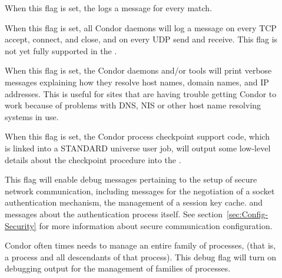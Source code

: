 \begin{description}
\begin{description}
  \item[] \label{dflag:match}
    When this flag is
    set, the  logs a message for every match.

  \item[] \label{dflag:network}
    When this flag is set,
    all Condor daemons will log a message on every TCP accept, connect,
    and close, and on every UDP send and receive.  This flag is not
    yet fully supported in the .

  \item[] \label{dflag:hostname}
    When this flag is set, the Condor daemons and/or tools will print
    verbose messages explaining how they resolve host names, domain
    names, and IP addresses.
    This is useful for sites that are having trouble getting Condor to
    work because of problems with DNS, NIS or other host name resolving
    systems in use.

  \item[] \label{dflag:ckpt}
    When this flag is set,
    the Condor process checkpoint support code, which is linked into a STANDARD 
    universe user job, will output some low-level details about the checkpoint
    procedure into the .

  \item[] \label{dflag:security}
    This flag will enable debug messages pertaining to the setup of 
    secure network communication, 
    including messages for the negotiation of a socket 
    authentication mechanism, the management of a session key cache.
    and messages about the authentication process itself.  See
    section~\ref{sec:Config-Security} for more information about
    secure communication configuration.

  \item[] \label{dflag:procfamily}
    Condor often times needs to manage an entire family of processes, (that
    is, a 
    process and all descendants of that process).  This debug flag will 
    turn on debugging output for the management of families of processes.


\end{description}
\end{description}
